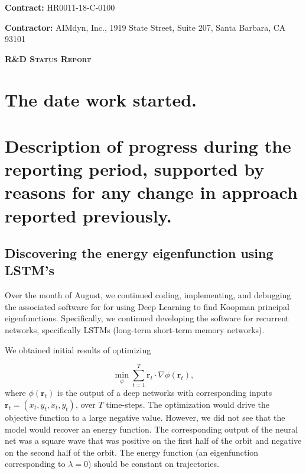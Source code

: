 \documentclass[11pt]{article}
\newcommand{\mbf}{\mathbf} 			%
\theoremstyle{plain}
\theoremstyle{remark}
\theoremstyle{definition}
\begin{document}
\noindent\textbf{Contract:} HR0011-18-C-0100

\noindent\textbf{Contractor:} AIMdyn, Inc., 1919 State Street, Suite 207, Santa Barbara, CA 93101

\noindent\textbf{\textsc{R\&D Status Report}}


\section{The date work started.}



\section{Description of progress during the reporting period, supported by reasons for any change in approach reported previously.}


\subsection{Discovering the energy eigenfunction using LSTM's}
Over the month of August,
we continued coding, implementing, and debugging the associated software for 
for using Deep Learning to find Koopman principal eigenfunctions.
Specifically, we continued developing the software for recurrent networks, 
specifically LSTMs (long-term short-term memory networks). 

We obtained initial results of optimizing 

\begin{equation}
\min_{\phi} \sum_{t=1}^T \dot{\mbf r}_t \cdot \nabla  \phi(\mbf{r}_t),
\end{equation}
where $\phi(\mbf{r}_t)$ is the output of a deep networks with
corresponding inputs $\mbf{r}_t = (x_t,y_t,\dot{x}_t,\dot{y}_t)$, over $T$ time-steps.
The optimization would drive the objective function to a large negative value. However, we did not see that the model would recover an energy function. The corresponding output of the neural net was a square wave that was positive on the first half of the orbit and negative on the second half of the orbit. The energy function (an eigenfunction corresponding to $\lambda = 0$) should be constant on trajectories.
\end{document}
